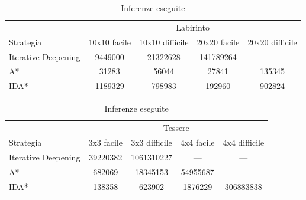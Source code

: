 \documentclass[a4paper,oneside,12pt]{book}
\begin{document}
    \begin{table}
        \centering
        \begin{tabular}{l c c c c}
            \toprule %
            & \multicolumn{4}{c}{Labirinto} \\ %
            \cmidrule(l){2-5} %
            Strategia & 10x10 facile & 10x10 difficile & 20x20 facile & 20x20 difficile\\ %
            \midrule %
            Iterative Deepening
            & \num{9449000}& \num{21322628} & \num{141789264} & --- \\ %
            A*
            & \num{31283} & \num{56044} & \num{27841} & \num{135345}\\ %
            IDA*
            & \num{1189329} & \num{798983} & \num{192960} & \num{902824} \\ %

            \bottomrule
        \end{tabular}
        \caption{Inferenze eseguite}
    \end{table}
    \begin{table}
        \centering
        \begin{tabular}{l c c c c}
            \toprule %
            & \multicolumn{4}{c}{Tessere} \\ %
            \cmidrule(l){2-5} %
            Strategia & 3x3 facile & 3x3 difficile & 4x4 facile & 4x4 difficile\\ %
            \midrule %
            Iterative Deepening
            & \num{39220382}& \num{1061310227} & --- & --- \\ %
            A*
            & \num{682069} & \num{18345153} & \num{54955687	} & --- \\ %
            IDA*
            & \num{138358} & \num{623902} & \num{1876229} & \num{306883838}\\ %
            \bottomrule
        \end{tabular}
        \caption{Inferenze eseguite}
    \end{table}
    \FloatBarrier
    \restoregeometry
\end{document}

